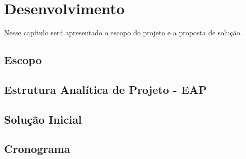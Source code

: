 \chapter{Desenvolvimento}\label{cap2}
 Nesse capítulo será apresentado o escopo do projeto e a proposta de solução.

 \section{Escopo}
  

\section{Estrutura Analítica de Projeto - EAP}
  

\section{Solução Inicial}

  

\section{Cronograma}
  


